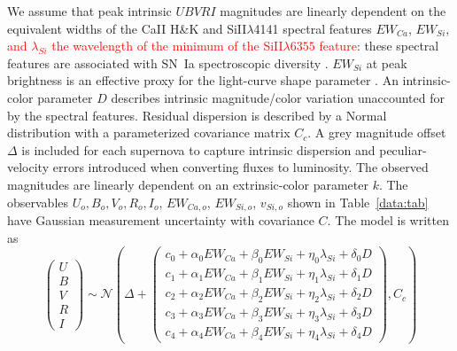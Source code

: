 \documentclass{aastex61}   	%
\begin{document}
We assume 
that  peak intrinsic $UBVRI$ magnitudes are linearly dependent
on the
 equivalent widths of the CaII H\&K and SiII$\lambda$4141 spectral features
$EW_{Ca}$, $EW_{Si}$,
\textcolor{red}{ and $\lambda_{Si}$ the wavelength of the minimum of 
the SiII$\lambda6355$ feature}:
these spectral features are associated with SN~Ia  spectroscopic diversity  
\citep{2006PASP..118..560B, 2008A&A...492..535A, 2009A&A...500L..17B, 2009PASP..121..238B, 2009ApJ...699L.139W, 2011ApJ...729...55F}.
$EW_{Si}$ at peak brightness is an effective proxy for the light-curve shape parameter
\citep{2008A&A...492..535A, 2011A&A...529L...4C}. 
An intrinsic-color parameter $D$ describes  intrinsic magnitude/color variation unaccounted for by the spectral features.
Residual dispersion is described by a Normal distribution with a parameterized covariance matrix
$C_c$.  A grey magnitude offset $\Delta$ is included for each supernova
to capture intrinsic dispersion and peculiar-velocity errors introduced when converting fluxes to luminosity.
The observed magnitudes are linearly dependent on an
extrinsic-color parameter $k$.  The observables
$U_o, B_o, V_o, R_o, I_o$, $EW_{Ca,o}$, $EW_{Si,o}$, $v_{Si,o}$
shown in Table~\ref{data:tab} have Gaussian measurement uncertainty with covariance $C$.
The model is written as
\begin{equation}
\begin{pmatrix}
U\\B\\V\\R\\I
\end{pmatrix}
\sim \mathcal{N}
\left(
\Delta +
\begin{pmatrix}
c_0+\alpha_0 EW_{Ca} + \beta_0 EW_{Si} + \eta_0 \lambda_{Si} + \delta_0 D\\
c_1+\alpha_1 EW_{Ca} + \beta_1 EW_{Si} + \eta_1 \lambda_{Si} + \delta_1 D \\
c_2+\alpha_2 EW_{Ca} + \beta_2 EW_{Si} + \eta_2 \lambda_{Si} + \delta_2 D\\
c_3+\alpha_3 EW_{Ca} + \beta_3 EW_{Si} + \eta_3 \lambda_{Si} + \delta_3 D\\
c_4+\alpha_4 EW_{Ca} + \beta_4 EW_{Si}+ \eta_4 \lambda_{Si} + \delta_4 D
\end{pmatrix}
,C_{c}
\right)
\label{ewsiv:eqn}
\end{equation}
\end{document}
